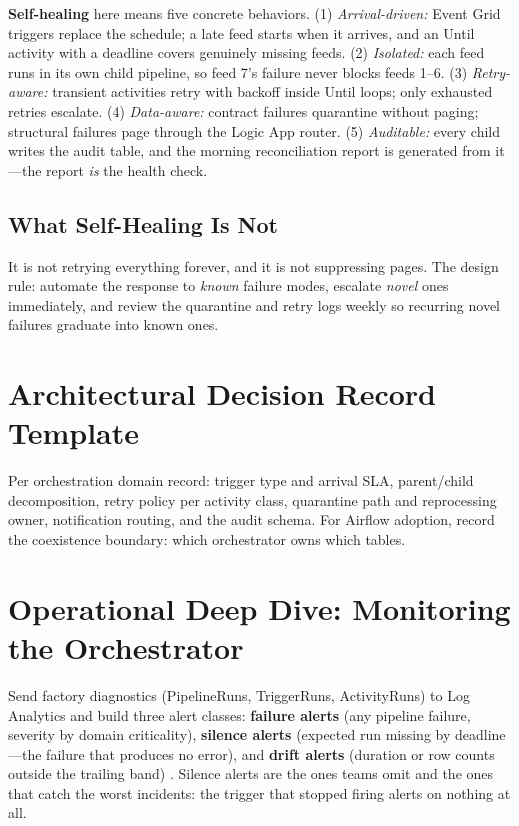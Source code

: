 \textbf{Self-healing} here means five concrete behaviors. (1) \emph{Arrival-driven:} Event Grid triggers replace the schedule; a late feed starts when it arrives, and an Until activity with a deadline covers genuinely missing feeds. (2) \emph{Isolated:} each feed runs in its own child pipeline, so feed 7's failure never blocks feeds 1--6. (3) \emph{Retry-aware:} transient activities retry with backoff inside Until loops; only exhausted retries escalate. (4) \emph{Data-aware:} contract failures quarantine without paging; structural failures page through the Logic App router. (5) \emph{Auditable:} every child writes the audit table, and the morning reconciliation report is generated from it---the report \emph{is} the health check.

\subsection{What Self-Healing Is Not}
It is not retrying everything forever, and it is not suppressing pages. The design rule: automate the response to \emph{known} failure modes, escalate \emph{novel} ones immediately, and review the quarantine and retry logs weekly so recurring novel failures graduate into known ones.

\section{Architectural Decision Record Template}
Per orchestration domain record: trigger type and arrival SLA, parent/child decomposition, retry policy per activity class, quarantine path and reprocessing owner, notification routing, and the audit schema. For Airflow adoption, record the coexistence boundary: which orchestrator owns which tables.

\section{Operational Deep Dive: Monitoring the Orchestrator}
Send factory diagnostics (PipelineRuns, TriggerRuns, ActivityRuns) to Log Analytics and build three alert classes: \textbf{failure alerts} (any pipeline failure, severity by domain criticality), \textbf{silence alerts} (expected run missing by deadline---the failure that produces no error), and \textbf{drift alerts} (duration or row counts outside the trailing band) \cite{microsoft2025azureMonitor}. Silence alerts are the ones teams omit and the ones that catch the worst incidents: the trigger that stopped firing alerts on nothing at all.

